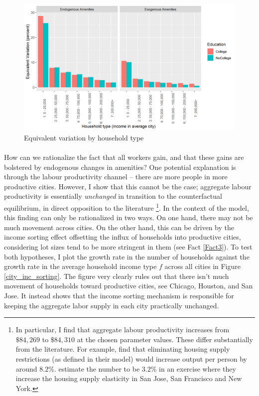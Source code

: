 \documentclass[]{article}
\begin{document}
\begin{figure}[htbp]
	\begin{center}
		\includegraphics[width=1.1\textwidth]{Welfare.png}
		\caption{Equivalent variation by household type}\label{welfare_ctfl}
	\end{center}
\end{figure}

\paragraph*{}
How can we rationalize the fact that all workers gain, and that these gains are bolstered by endogenous changes in amenities? One potential explanation is through the labour productivity channel -- there are more people in more productive cities. However, I show that this cannot be the case; aggregate labour productivity is essentially \textit{unchanged} in transition to the counterfactual equilibrium, in direct opposition to the literature \citep{hseihmoretti} \citep{durantonpugaurbgrowth} \citep{parkho} \citep{hop}\footnote{In particular, I find that aggregate labour productivity increases from $\$84,269$ to $\$84,310$ at the chosen parameter values. These differ substantially from the literature. For example, \cite{durantonpugaurbgrowth} find that eliminating housing supply restrictions (as defined in their model) would increase output per person by around $8.2\%$. \cite{hseihmoretti} estimate the number to be $3.2\%$ in an exercise where they increase the housing supply elasticity in San Jose, San Francisco and New York.}. In the context of the model, this finding can only be rationalized in two ways. On one hand, there may not be much movement across cities. On the other hand, this can be driven by the income sorting effect offsetting the influx of households into productive cities, considering lot sizes tend to be more stringent in them (see Fact \ref{Fact3}). To test both hypotheses, I plot the growth rate in the number of households against the growth rate in the average household income type $f$ across all cities in Figure \ref{city_inc_sorting}. The figure very clearly rules out that there isn't much movement of households toward productive cities, see Chicago, Houston, and San Jose. It instead shows that the income sorting mechanism is responsible for keeping the aggregate labor supply in each city practically unchanged.  
\end{document}
